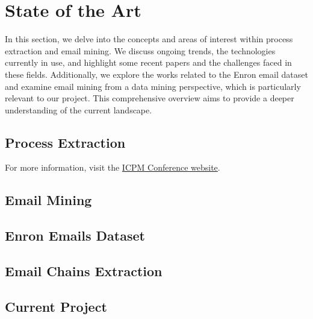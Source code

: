 \chapter{State of the Art}
\label{chp:state_of_the_art}

 In this section, we delve into the concepts and areas of interest within process extraction and email mining. We discuss ongoing trends, the technologies currently in use, and highlight some recent papers and the challenges faced in these fields. Additionally, we explore the works related to the Enron email dataset and examine email mining from a data mining perspective, which is particularly relevant to our project. This comprehensive overview aims to provide a deeper understanding of the current landscape.

\section{Process Extraction}
\label{sec:process_extraction}



For more information, visit the \href{https://icpmconference.org/}{ICPM Conference website}.




\section{Email Mining}
\label{sec:email_mining}


\section{Enron Emails Dataset}
\label{sec:enron_emails_dataset}


\section{Email Chains Extraction}
\label{sec:email_chains_extraction}


\section{Current Project}
\label{sec:current_project}